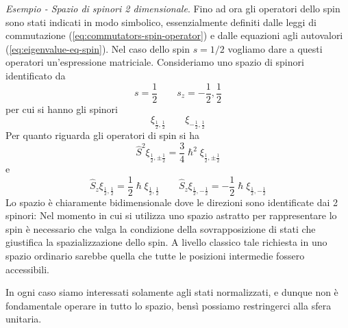\emph{Esempio - Spazio di spinori 2 dimensionale}.
Fino ad ora gli operatori dello spin sono stati indicati in modo simbolico, essenzialmente definiti dalle leggi di
commutazione (\ref{eq:commutators-spin-operator}) e dalle equazioni agli autovalori (\ref{eq:eigenvalue-eq-spin}).
Nel caso dello spin $s=1/2$ vogliamo dare a questi operatori un’espressione matriciale.
Consideriamo uno spazio di spinori identificato da \[
                                                       s = \frac{1}{2} \qquad s_{z} = - \frac{1}{2} , \frac{1}{2}
\] per cui si hanno gli spinori \[
                                    \xi_{\frac{1}{2}, \frac{1}{2}} \qquad \xi_{- \frac{1}{2}, \frac{1}{2}}
\] Per quanto riguarda gli operatori di spin si ha \[
                                                       \hat{S}^{2} \xi_{\frac{1}{2}, \pm \frac{1}{2}} = \frac{3}{4} \hslash^{2} \xi_{\frac{1}{2}, \pm \frac{1}{2}}
\] e \[
         \hat{S}_{z} \xi_{\frac{1}{2}, \frac{1}{2}} = \frac{1}{2} \hslash \xi_{\frac{1}{2}, \frac{1}{2}} \qquad
         \hat{S}_{z} \xi_{\frac{1}{2}, - \frac{1}{2}} = - \frac{1}{2} \hslash \xi_{\frac{1}{2}, -\frac{1}{2}}
\] Lo spazio è chiaramente bidimensionale dove le direzioni sono
identificate dai 2 spinori:
Nel momento in cui si utilizza uno spazio astratto per rappresentare lo
spin è necessario che valga la condizione della sovrapposizione di stati
che giustifica la spazializzazione dello spin.
A livello classico tale
richiesta in uno spazio ordinario sarebbe quella che tutte le posizioni
intermedie fossero accessibili.

In ogni caso siamo interessati solamente agli stati normalizzati, e
dunque non è fondamentale operare in tutto lo spazio, bensì possiamo
restringerci alla sfera unitaria.

